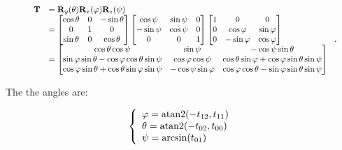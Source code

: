     \begin{equation}
        \scalebox{0.85}{
            $ \begin{array}{ll}
                \mathbf{T}
                &= \mathbf{R}_{y}(\theta)\mathbf{R}_{x}(\varphi)\mathbf{R}_{z}(\psi) \\
                &=
                \begin{bmatrix}
                    \cos \theta & 0 & -\sin \theta \\
                    0 & 1 & 0 \\
                    \sin \theta & 0 & \cos \theta
                \end{bmatrix}
                \begin{bmatrix}
                    \cos \psi & \sin \psi & 0 \\
                    -\sin \psi & \cos \psi & 0 \\
                    0 & 0 & 1
                \end{bmatrix}
                \begin{bmatrix}
                    1 & 0 & 0 \\
                    0 & \cos \varphi & \sin \varphi \\
                    0 & -\sin \varphi & \cos \varphi
                \end{bmatrix} \\
                &=
                \begin{bmatrix}
                    \cos \theta \cos \psi
                    &  \sin \psi
                    & -\cos \psi \sin \theta \\
                    \sin \varphi \sin \theta - \cos \varphi \cos \theta \sin \psi
                    & \cos \varphi \cos \psi
                    & \cos \theta \sin \varphi + \cos \varphi \sin \theta \sin \psi \\
                    \cos \varphi \sin \theta + \cos \theta \sin \varphi \sin \psi
                    & -\cos \psi \sin \varphi
                    & \cos \varphi \cos \theta - \sin \varphi \sin \theta \sin \psi
                \end{bmatrix}
            \end{array} $
        }
    .\end{equation}

    The the angles are:

    \begin{equation}
        \left\{ \begin{array}{l}
            \varphi = \operatorname{atan2}(-t_{12}, t_{11}) \\
            \theta = \operatorname{atan2}(-t_{02}, t_{00}) \\
            \psi = \arcsin(t_{01})
        \end{array} \right.
    \end{equation}

